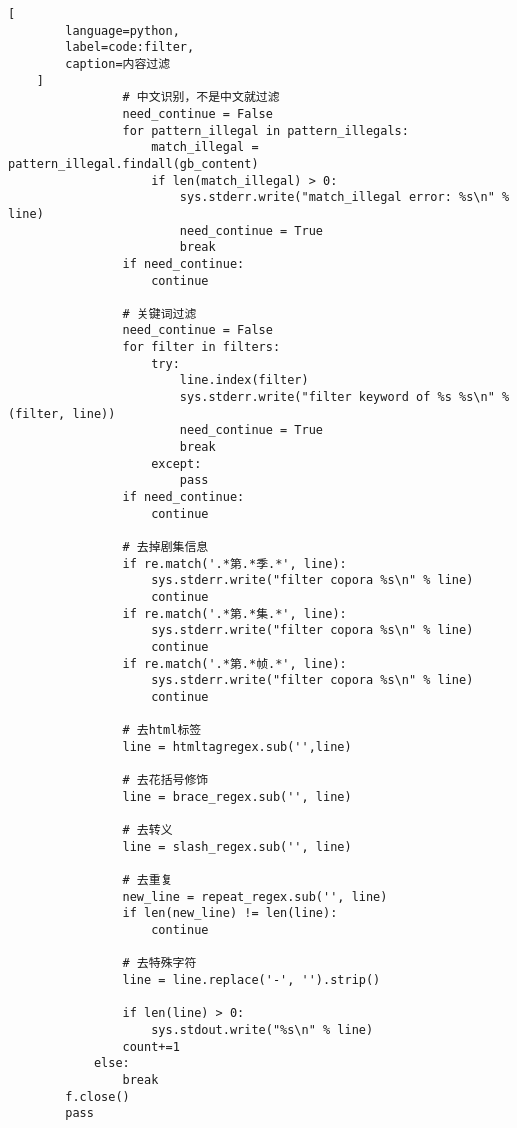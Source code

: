 \begin{appendices}
\begin{lstlisting}[
        language=python,
        label=code:filter,
        caption=内容过滤
    ]
                # 中文识别，不是中文就过滤
                need_continue = False
                for pattern_illegal in pattern_illegals:
                    match_illegal = pattern_illegal.findall(gb_content)
                    if len(match_illegal) > 0:
                        sys.stderr.write("match_illegal error: %s\n" % line)
                        need_continue = True
                        break
                if need_continue:
                    continue
    
                # 关键词过滤
                need_continue = False
                for filter in filters:
                    try:
                        line.index(filter)
                        sys.stderr.write("filter keyword of %s %s\n" % (filter, line))
                        need_continue = True
                        break
                    except:
                        pass
                if need_continue:
                    continue
    
                # 去掉剧集信息
                if re.match('.*第.*季.*', line):
                    sys.stderr.write("filter copora %s\n" % line)
                    continue
                if re.match('.*第.*集.*', line):
                    sys.stderr.write("filter copora %s\n" % line)
                    continue
                if re.match('.*第.*帧.*', line):
                    sys.stderr.write("filter copora %s\n" % line)
                    continue
    
                # 去html标签
                line = htmltagregex.sub('',line)
    
                # 去花括号修饰
                line = brace_regex.sub('', line)
    
                # 去转义
                line = slash_regex.sub('', line)
    
                # 去重复
                new_line = repeat_regex.sub('', line)
                if len(new_line) != len(line):
                    continue
    
                # 去特殊字符
                line = line.replace('-', '').strip()
    
                if len(line) > 0:
                    sys.stdout.write("%s\n" % line)
                count+=1
            else:
                break
        f.close()
        pass
    

\end{lstlisting}
\end{appendices}
